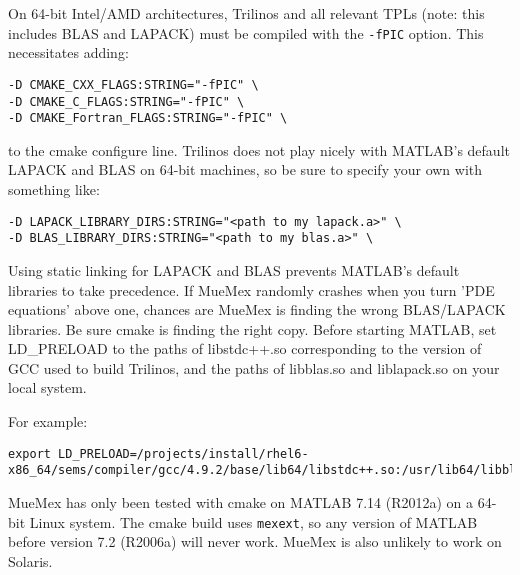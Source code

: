 On 64-bit Intel/AMD architectures, Trilinos and all relevant TPLs
(note: this includes BLAS and LAPACK)
must be compiled with the \texttt{-fPIC} option.  This necessitates adding:
\begin{verbatim}
-D CMAKE_CXX_FLAGS:STRING="-fPIC" \
-D CMAKE_C_FLAGS:STRING="-fPIC" \
-D CMAKE_Fortran_FLAGS:STRING="-fPIC" \
\end{verbatim}
to the cmake configure line.  Trilinos does not play nicely with
MATLAB's default LAPACK and BLAS on 64-bit machines, so be sure to
specify your own with something like:
\begin{verbatim}
-D LAPACK_LIBRARY_DIRS:STRING="<path to my lapack.a>" \
-D BLAS_LIBRARY_DIRS:STRING="<path to my blas.a>" \
\end{verbatim}
Using static linking for LAPACK and BLAS prevents MATLAB's default libraries to take precedence.
%
If MueMex randomly crashes when you turn 'PDE equations' above one,
chances are MueMex is finding the wrong BLAS/LAPACK libraries. Be sure
cmake is finding the right copy. Before starting MATLAB, set
LD_PRELOAD to the paths of libstdc++.so corresponding to the version of GCC used
to build Trilinos, and the paths of libblas.so and liblapack.so on your local system.

For example:

\begin{verbatim}
export LD_PRELOAD=/projects/install/rhel6-x86_64/sems/compiler/gcc/4.9.2/base/lib64/libstdc++.so:/usr/lib64/libblas.so:/usr/lib64/liblapack.so
\end{verbatim}

MueMex has only been tested with cmake 
on MATLAB 7.14 (R2012a) on a 64-bit Linux system.  The cmake build uses 
\texttt{mexext}, so any version of MATLAB before version 7.2 (R2006a) will
never work.  MueMex is also unlikely to work on Solaris.

